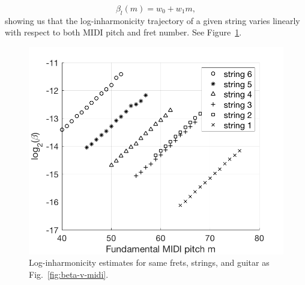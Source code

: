 \documentclass[convention,peer-reviewed]{aesconf}
\begin{document}
\begin{equation}
\label{eq:linear-traj}
\beta_l(m) = w_0 + w_1m,
\end{equation}
showing us that the log-inharmonicity trajectory of a given string varies linearly with respect to both MIDI pitch and fret number. See Figure~\ref{fig:log-beta-v-midi}.
\begin{figure}[!htbp] 
\centering
\includegraphics[scale=0.25]{log-beta-v-midi}
%
\caption{Log-inharmonicity estimates for same frets, strings, and guitar as Fig.~\ref{fig:beta-v-midi}.}
\label{fig:log-beta-v-midi}
\end{figure}
\end{document}
